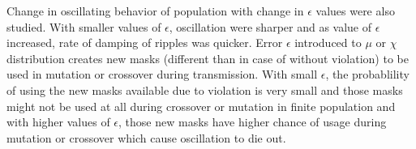 Change in oscillating behavior of population with change in $\epsilon$ values were also studied. With smaller values of $\epsilon$, 
oscillation were sharper and as value of $\epsilon$ increased, rate of damping of ripples was quicker. Error $\epsilon$ introduced 
to $\mu$ or $\chi$ distribution creates new masks (different than in case of without violation) to be used in mutation or crossover during transmission.
With small $\epsilon$, the probablility of using the new masks available due to violation is very small and 
those masks might not be used at all during crossover or mutation in finite population and with higher values of $\epsilon$, 
those new masks have higher chance of usage during mutation or crossover which cause oscillation to die out.









 
